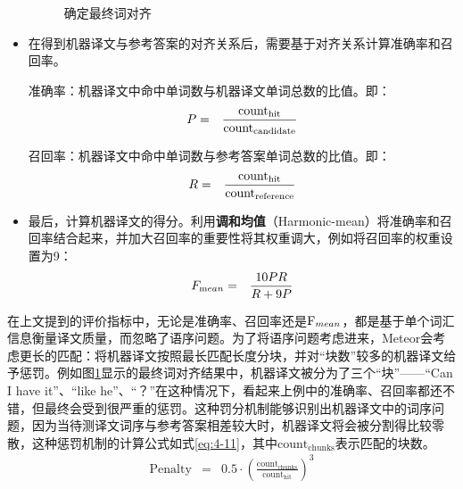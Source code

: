 \begin{itemize}
\begin{figure}[htp]
    \centering
	
   	\caption{确定最终词对齐}
  	 \label{fig:4-6}
\end{figure}
\vspace{0.5em}
\item 在得到机器译文与参考答案的对齐关系后，需要基于对齐关系计算准确率和召回率。

准确率：机器译文中命中单词数与机器译文单词总数的比值。即：
\begin{eqnarray}
{P} &=& \frac {\textrm{count}_{\textrm{hit}}}{\textrm{count}_{\textrm{candidate}}}
\label{eq:4-8}
\end{eqnarray}

召回率：机器译文中命中单词数与参考答案单词总数的比值。即：
\begin{eqnarray}
{R} &=& \frac {\textrm{count}_{\textrm{hit}}}{\textrm{count}_{\textrm{reference}}}
\label{eq:4-9}
\end{eqnarray}

\vspace{0.5em}
\item 最后，计算机器译文的得分。利用{\small\sffamily\bfseries{调和均值}}（Harmonic-mean）将准确率和召回率结合起来，并加大召回率的重要性将其权重调大，例如将召回率的权重设置为9：
\begin{eqnarray}
{F_{\textrm mean}} &=& \frac {10{PR}}{{R+9P}}
\label{eq:4-10}
\end{eqnarray}
\vspace{0.5em}
\end{itemize}

\parinterval 在上文提到的评价指标中，无论是准确率、召回率还是$\textrm F_{mean}$，都是基于单个词汇信息衡量译文质量，而忽略了语序问题。为了将语序问题考虑进来，Meteor会考虑更长的匹配：将机器译文按照最长匹配长度分块，并对“块数”较多的机器译文给予惩罚。例如图\ref{fig:4-6}显示的最终词对齐结果中，机器译文被分为了三个“块”——“Can I have it”、“like he”、“？”在这种情况下，看起来上例中的准确率、召回率都还不错，但最终会受到很严重的惩罚。这种罚分机制能够识别出机器译文中的词序问题，因为当待测译文词序与参考答案相差较大时，机器译文将会被分割得比较零散，这种惩罚机制的计算公式如式\eqref{eq:4-11}，其中$\textrm {count}_{\textrm{chunks}}$表示匹配的块数。
\begin{eqnarray}
\textrm {Penalty} &=& 0.5 \cdot {\left({\frac{{\textrm {count}}_{\textrm {chunks}}}{\textrm {count}_{\textrm{hit}}}} \right)^3}
\label{eq:4-11}
\end{eqnarray}

